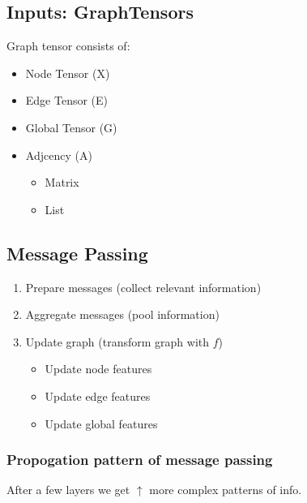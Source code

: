 \subsection{Inputs: GraphTensors}
\begin{notes}
    Graph tensor consists of:
    \begin{itemize}
        \item Node Tensor (X)
        \item Edge Tensor (E)
        \item Global Tensor (G)
        \item Adjcency (A)
        \begin{itemize}
            \item Matrix
            \item List
        \end{itemize}
    \end{itemize}
\end{notes}

\subsection{Message Passing}
\begin{algo}
    \begin{enumerate}
        \item Prepare messages (collect relevant information)
        \item Aggregate messages (pool information)
        \item Update graph (transform graph with \(f\))
        \begin{itemize}
            \item Update node features
            \item Update edge features
            \item Update global features
        \end{itemize}
    \end{enumerate}
\end{algo}
\newpage

\subsubsection{Propogation pattern of message passing}
\begin{notes}
    After a few layers we get $\uparrow$ more complex patterns of info. 
\end{notes}

